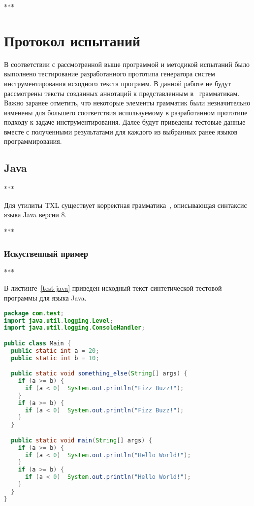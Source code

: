 ***

\section{Протокол испытаний}

В соответствии с рассмотренной выше программой и методикой испытаний было выполнено тестирование разработанного прототипа генератора систем инструментирования исходного текста программ.
В данной работе не будут рассмотрены тексты созданных аннотаций к представленным в~\cite{txl-resources} грамматикам.
Важно заранее отметить, что некоторые элементы грамматик были незначительно изменены для большего соответствия используемому в разработанном прототипе подходу к задаче инструментирования.
Далее будут приведены тестовые данные вместе с полученными результатами для каждого из выбранных ранее языков программирования.

\subsection{Java}

***

Для утилиты TXL существует корректная грамматика~\cite{txl-resources}, описывающая синтаксис языка Java версии 8.

***

\subsubsection{Искуственный пример}

***

В листинге~\ref{test-java} приведен исходный текст синтетической тестовой программы для языка Java.

\begin{lstlisting}[frame=single, language=Java, label={test-java}, caption={Исходный текст тестового приложения.}]
package com.test;
import java.util.logging.Level;
import java.util.logging.ConsoleHandler;

public class Main {
  public static int a = 20;
  public static int b = 10;

  public static void something_else(String[] args) {
    if (a >= b) {
      if (a < 0)  System.out.println("Fizz Buzz!");
    }
    if (a >= b) {
      if (a < 0)  System.out.println("Fizz Buzz!");
    }
  }

  public static void main(String[] args) {
    if (a >= b) {
      if (a < 0)  System.out.println("Hello World!");
    }
    if (a >= b) {
      if (a < 0)  System.out.println("Hello World!");
    }
  }
}
\end{lstlisting}

